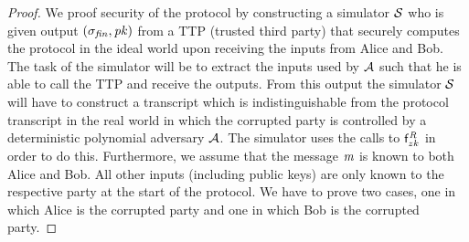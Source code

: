 \begin{proof}
    We proof security of the protocol by constructing a simulator $\mathcal{S}$ who is given output $(\sigma_{\mathit{fin}}, \mathit{pk})$ from a TTP (trusted third party) that securely computes the protocol in the ideal world upon receiving the inputs from Alice and Bob.
    The task of the simulator will be to extract the inputs used by $\mathcal{A}$ such that he is able to call the TTP and receive the outputs.
    From this output the simulator $\mathcal{S}$ will have to construct a transcript which is indistinguishable from the protocol transcript in the real world in which the corrupted party is controlled by a deterministic polynomial adversary $\mathcal{A}$.
    The simulator uses the calls to $\mathsf{f}^{\mathit{R}}_{zk}$ in order to do this.
    Furthermore, we assume that the message $\mathit{m}$ is known to both Alice and Bob.
    All other inputs (including public keys) are only known to the respective party at the start of the protocol.
    We have to prove two cases, one in which Alice is the corrupted party and one in which Bob is the corrupted party.
    

\end{proof}
